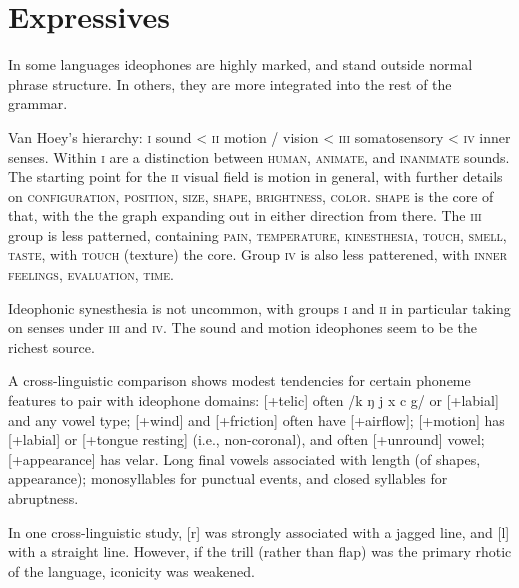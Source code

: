 \documentclass[11pt]{article}
\newcommand{\I}[1]{\textsc{#1}}   %
\begin{document}
{\section{Expressives}
In some languages ideophones are highly marked, and stand outside
normal phrase structure.  In others, they are more integrated into the
rest of the grammar.

Van Hoey's hierarchy: \I{i} sound < \I{ii} motion / vision < \I{iii}
somatosensory < \I{iv} inner senses.  Within \I{i} are a distinction
between \I{human}, \I{animate}, and \I{inanimate} sounds.  The
starting point for the \I{ii} visual field is motion in general, with
further details on \I{configuration, position, size, shape,
brightness, color}.  \I{shape} is the core of that, with the the
graph expanding out in either direction from there.  The \I{iii} group
is less patterned, containing \I{pain, temperature, kinesthesia,
touch, smell, taste,} with \I{touch} (texture) the core.  Group
\I{iv} is also less patterened, with \I{inner feelings, evaluation,
time}.

Ideophonic synesthesia is not uncommon, with groups \I{i} and \I{ii}
in particular taking on senses under \I{iii} and \I{iv}.  The sound
and motion ideophones seem to be the richest source.

A cross-linguistic comparison shows modest tendencies for certain
phoneme features to pair with ideophone domains: [+telic] often /k ŋ j
x c g/ or [+labial] and any vowel type; [+wind] and [+friction] often
have [+airflow]; [+motion] has [+labial] or [+tongue resting] (i.e.,
non-coronal), and often [+unround] vowel; [+appearance] has velar.
Long final vowels associated with length (of shapes, appearance);
monosyllables for punctual events, and closed syllables for
abruptness. 
%

In one cross-linguistic study, [r] was strongly associated with a
jagged line, and [l] with a straight line.  However, if the trill
(rather than flap) was the primary rhotic of the language, iconicity
was weakened.

}
\end{document}
